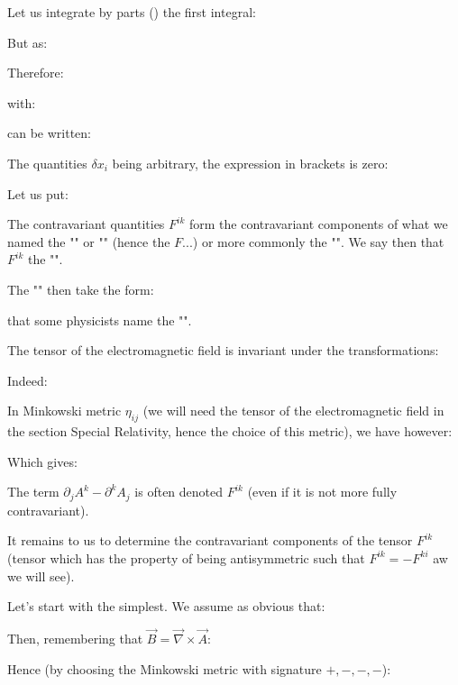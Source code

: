 	Let us integrate by parts () the first integral:
	
	But as:
	
	Therefore:
	
	with:
	
	can be written:
	
	The quantities $\delta x_i$ being arbitrary, the expression in brackets is zero:
	
	Let us put:
	
	The contravariant quantities $F^{ik}$ form the contravariant components of what we named the "" or "" (hence the $F$...) or more commonly the "". We say then that $F^{ik}$ the "".

	The "" then take the form:
	
	that some physicists name the "".	
	\begin{tcolorbox}	[title=Remark,colframe=black,arc=10pt]
	The tensor of the electromagnetic field is invariant under the transformations:
	
	Indeed:
	
	\end{tcolorbox}
	In Minkowski metric $\eta_{ij}$ (we will need the tensor of the electromagnetic field in the section Special Relativity, hence the choice of this metric), we have however:
	
	Which gives:
	
	The term $\partial_jA^k-\partial^k A_j$ is often denoted $F^{ik}$ (even if it is not more fully contravariant).

	It remains to us to determine the contravariant components of the tensor $F^{ik}$ (tensor which has the property of being antisymmetric such that $F^{ik}=-F^{ki}$ aw we will see).

	Let's start with the simplest. We assume as obvious that:
	
	Then, remembering that $\vec{B}=\vec{\nabla}\times\vec{A}$:
	
	Hence (by choosing the Minkowski metric with signature $+, -, -, -$):
	
